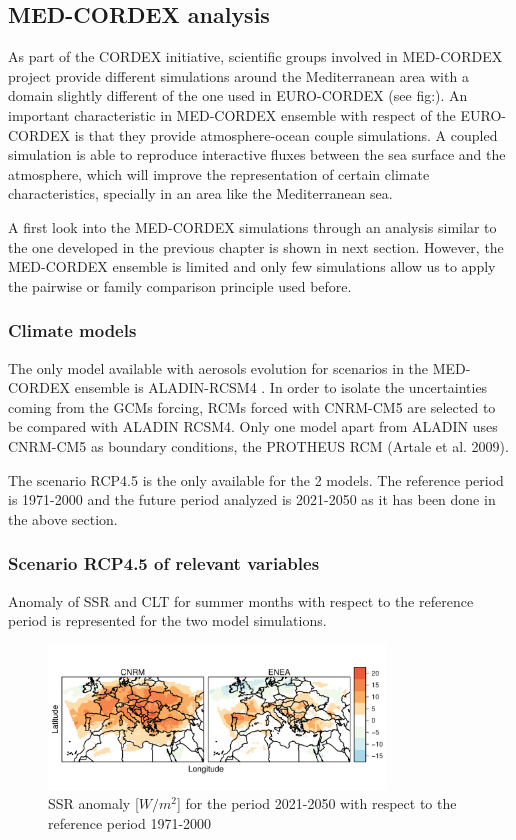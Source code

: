\begin{subappendices}
\subsection{MED-CORDEX analysis}

As part of the CORDEX initiative, scientific groups involved in MED-CORDEX \cite*{Ruti2016} project provide different simulations around the Mediterranean area with a domain slightly different of the one used in EURO-CORDEX (see fig:). An important characteristic in MED-CORDEX ensemble with respect of the EURO-CORDEX is that they provide atmosphere-ocean couple simulations. A coupled simulation is able to reproduce interactive fluxes between the sea surface and the atmosphere, which will improve the representation of certain climate characteristics, specially in an area like the Mediterranean sea.

A first look into the MED-CORDEX simulations through an analysis  similar to the one developed in the previous chapter is shown in next section. However, the MED-CORDEX ensemble is limited and only few simulations allow us to apply the pairwise or family comparison principle used before.

\subsubsection{Climate models}

The only model available with aerosols evolution for scenarios in the MED-CORDEX ensemble is ALADIN-RCSM4 \cite*{Sevault2014}. In order to isolate the uncertainties coming from the GCMs forcing, RCMs forced with CNRM-CM5 are selected to be compared with ALADIN RCSM4. Only one model apart from ALADIN uses CNRM-CM5 as boundary conditions, the PROTHEUS RCM (Artale et al. 2009).

The scenario RCP4.5 is the only available for the 2 models. The reference period is 1971-2000 and the future period analyzed is 2021-2050 as it has been done in the above section.

\subsubsection{Scenario RCP4.5 of relevant variables}

Anomaly of SSR and CLT for summer months with respect to the reference period is represented for the two model simulations.

\begin{figure}[h!]
    \includegraphics[width=0.8\textwidth]{figs/capitulo7/diferences_ssr_newperiods_9abr.pdf}
    \caption{SSR anomaly [$W/m^2$] for the period 2021-2050 with respect to the reference period 1971-2000}
    \label{fig:medcordexssr}
\end{figure}


\end{subappendices}
